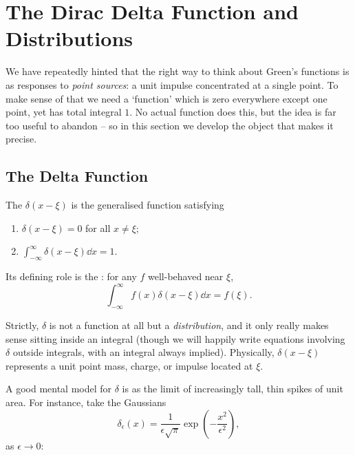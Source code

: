 \documentclass[a4paper]{scrartcl}
\begin{document}
\section{The Dirac Delta Function and Distributions}

We have repeatedly hinted that the right way to think about Green's functions is as responses to \emph{point sources}: a unit impulse concentrated at a single point. To make sense of that we need a `function' which is zero everywhere except one point, yet has total integral $1$. No actual function does this, but the idea is far too useful to abandon -- so in this section we develop the object that makes it precise.

\subsection{The Delta Function}

\begin{definition}
    The  $\delta(x - \xi)$ is the generalised function satisfying
    \begin{enumerate}[label=(\roman*)]
        \item $\delta(x - \xi) = 0$ for all $x \neq \xi$;
        \item $\int_{-\infty}^{\infty} \delta(x - \xi) \dd x = 1$.
    \end{enumerate}
    Its defining role is the : for any $f$ well-behaved near $\xi$,
    $$
    \int_{-\infty}^{\infty} f(x) \delta(x - \xi) \dd x = f(\xi).
    $$
\end{definition}

Strictly, $\delta$ is not a function at all but a \emph{distribution}, and it only really makes sense sitting inside an integral (though we will happily write equations involving $\delta$ outside integrals, with an integral always implied). Physically, $\delta(x - \xi)$ represents a unit point mass, charge, or impulse located at $\xi$.

A good mental model for $\delta$ is as the limit of increasingly tall, thin spikes of unit area. For instance, take the Gaussians
$$
\delta_\epsilon(x) = \frac{1}{\epsilon \sqrt{\pi}} \exp\left(-\frac{x^2}{\epsilon^2}\right),
$$
as $\epsilon \rightarrow 0$:
\end{document}

